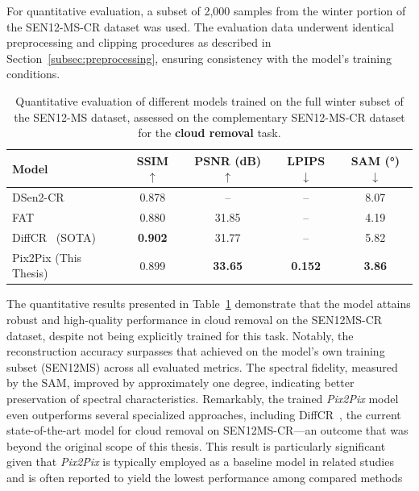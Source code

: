 For quantitative evaluation, a subset of 2,000 samples from the winter portion of the SEN12-MS-CR dataset was used. The evaluation data underwent identical preprocessing and clipping procedures as described in Section~\ref{subsec:preprocessing}, ensuring consistency with the model’s training conditions.

\begin{table}[h!]
    \centering
    \caption[Quantitative results on cloud removal]{Quantitative evaluation of different models trained on the full winter subset of the SEN12-MS dataset, assessed on the complementary SEN12-MS-CR dataset for the \textbf{cloud removal} task.}
    \begin{tabular}{lcccc}
        \toprule
        \textbf{Model}               & \textbf{SSIM $\uparrow$} & \textbf{PSNR (dB) $\uparrow$} & \textbf{LPIPS $\downarrow$} & \textbf{SAM (°) $\downarrow$} \\
        \midrule
        DSen2-CR~\cite{CR_SEN2_dRNN} & 0.878                    & --                            & --                          & 8.07                          \\
        FAT~\cite{c_guided_fus_s2ot} & 0.880                    & 31.85                         & --                          & 4.19                          \\
        DiffCR~\cite{DiffCR} (SOTA)  & \textbf{0.902}           & 31.77                         & --                          & 5.82                          \\
        Pix2Pix (This Thesis)        & 0.899                    & \textbf{33.65}                & \textbf{0.152}              & \textbf{3.86}                 \\
        \bottomrule
    \end{tabular}
    \label{tab:quantitative_result_cr}
\end{table}

The quantitative results presented in Table~\ref{tab:quantitative_result_cr} demonstrate that the model attains robust and high-quality performance in cloud removal on the SEN12MS-CR dataset, despite not being explicitly trained for this task. Notably, the reconstruction accuracy surpasses that achieved on the model’s own training subset (SEN12MS) across all evaluated metrics. The spectral fidelity, measured by the SAM, improved by approximately one degree, indicating better preservation of spectral characteristics. Remarkably, the trained \textit{Pix2Pix} model even outperforms several specialized approaches, including DiffCR~\cite{DiffCR}, the current state-of-the-art model for cloud removal on SEN12MS-CR—an outcome that was beyond the original scope of this thesis. This result is particularly significant given that \textit{Pix2Pix} is typically employed as a baseline model in related studies and is often reported to yield the lowest performance among compared methods 

